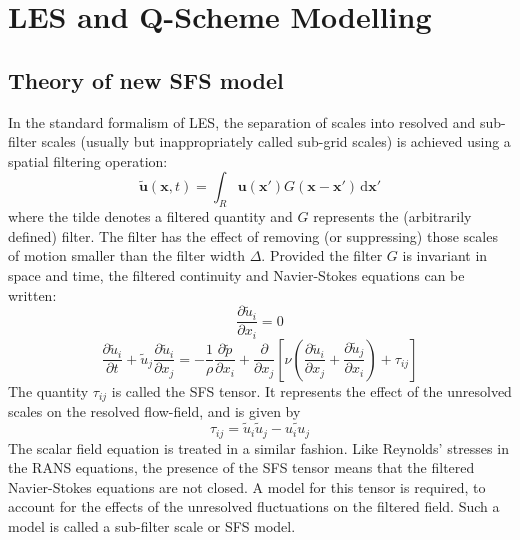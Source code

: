 \pagebreak




\section{LES and Q-Scheme Modelling} 
\label{LES and Q-Scheme Modelling} 



\subsection{Theory of new SFS model}
\label{SFSm} In the standard formalism of LES, the separation of
scales into resolved and sub-filter scales (usually but
inappropriately called sub-grid scales) is achieved using a
spatial filtering operation:
\begin{equation}
\mathbf{\tilde{u}}(\mathbf{x},t)= \int_{R} \mathbf{u}(\mathbf{x}')
G(\mathbf{x}-\mathbf{x}')\,\mathrm{d}\mathbf{x}'
\label{eq:Les-filter}
\end{equation}
where the tilde denotes a filtered quantity and $G$ represents the
(arbitrarily defined) filter. The filter has the effect of
removing (or suppressing) those scales of motion smaller than the
filter width $\Delta$. Provided the filter $G$ is invariant in
space and time\label{homo}, the filtered continuity and
Navier-Stokes equations can be written:
\begin{equation}
\frac{\partial \tilde{u}_i}{\partial x_i}=0
\end{equation}
\begin{equation}
\frac{\partial \tilde{u}_i}{\partial t}+ \tilde{u}_j
\frac{\partial \tilde{u}_i}{\partial x_j}= -\frac{1}{\rho}
\frac{\partial \tilde{p}}{\partial x_i}+ \frac{\partial}{\partial
x_j} \left[\nu\left(\frac{\partial \tilde{u}_i}{\partial x_j}+
\frac{\partial \tilde{u}_j}{\partial x_i}\right)+\tau_{ij}\right]
\label{eq:Les-NS2}
\end{equation}
The quantity $\tau_{ij}$ is called the SFS tensor. It represents
the effect of the unresolved scales on the resolved flow-field,
and is given by
\begin{equation}
\tau_{ij} = \tilde{u}_i \tilde{u}_j - \widetilde{u_i u_j}
\end{equation}
The scalar field equation is treated in a similar fashion. Like
Reynolds' stresses in the RANS equations, the presence of the SFS
tensor means that the filtered Navier-Stokes equations are not
closed. A model for this tensor is required, to account for the
effects of the unresolved fluctuations on the filtered field. Such
a model is called a sub-filter scale or SFS model.

